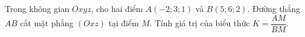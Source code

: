 \begin{ex}
Trong không gian $Oxyz$, cho hai điểm $A(-2;3;1)$ và $B(5;6;2)$. Đường thẳng $AB$ cắt mặt phẳng $(Oxz)$ tại điểm $M$. Tính giá trị của biểu thức $K=\dfrac{AM}{BM}$.
\end{ex}
